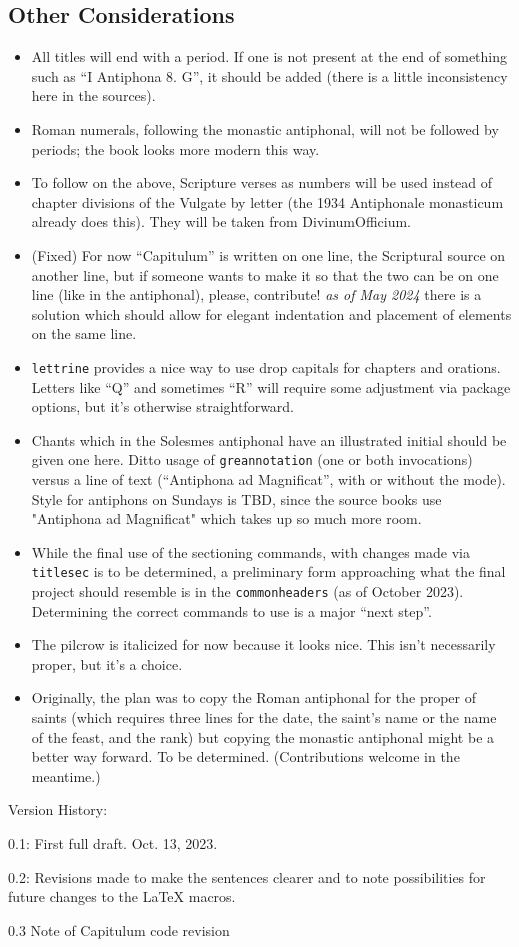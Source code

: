 \documentclass[11pt]{article}
\begin{document}
\subsection{Other Considerations}
\begin{itemize}
\item
All titles will end with a period. If one is not present at the end of something such as ``I Antiphona 8. G'', it should be added (there is a little inconsistency here in the sources).
\item
Roman numerals, following the monastic antiphonal, will not be followed by periods; the book looks more modern this way.
\item
To follow on the above, Scripture verses as numbers will be used instead of chapter divisions of the Vulgate by letter (the 1934 Antiphonale monasticum already does this). They will be taken from DivinumOfficium.
\item
(Fixed) For now ``Capitulum'' is written on one line, the Scriptural source on another line, but if someone wants to make it so that the two can be on one line (like in the antiphonal), please, contribute! \emph{as of May 2024} there is a solution which should allow for elegant indentation and placement of elements on the same line.

\item
\verb|lettrine| provides a nice way to use drop capitals for chapters and orations. Letters like ``Q'' and sometimes ``R'' will require some adjustment via package options, but it's otherwise straightforward.
\item
Chants which in the Solesmes antiphonal have an illustrated initial should be given one here. Ditto usage of \verb|greannotation| (one or both invocations) versus a line of text (``Antiphona ad Magnificat'', with or without the mode). Style for antiphons on Sundays is TBD, since the source books use "Antiphona ad Magnificat" which takes up so much more room.
\item While the final use of the sectioning commands, with changes made via \verb|titlesec| is  to be determined, a preliminary form approaching what the final project should resemble is in the \verb|commonheaders| (as of October 2023). Determining the correct commands to use is a major ``next step''.
\item
The pilcrow is italicized for now because it looks nice. This isn't necessarily proper, but it's a choice.
\item
Originally, the plan was to copy the Roman antiphonal for the proper of saints (which requires three lines for the date, the saint's name or the name of the feast, and the rank) but copying the monastic antiphonal might be a better way forward. To be determined. (Contributions welcome in the meantime.)

\end{itemize}

Version History:

0.1: First full draft. Oct. 13, 2023.

0.2: Revisions made to make the sentences clearer and to note possibilities for future changes to the LaTeX macros.

0.3 Note of Capitulum code revision
\end{document}
